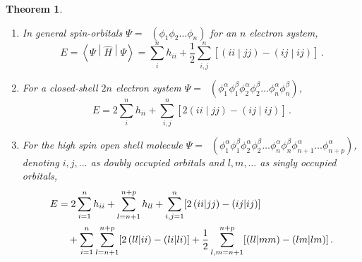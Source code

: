 \documentclass{article}
\theoremstyle{plain}\theoremheaderfont{\normalfont\itshape}\theorembodyfont{\rmfamily}\theoremseparator{.}\newtheorem*{rem}{Remark}\newtheorem*{ex}{Example}\newtheorem*{proof}{Proof}\newtheorem*{altp}{Alternative proof}
\theoremstyle{plain}\theoremheaderfont{\normalfont\bfseries}\theorembodyfont{\rmfamily}\theoremseparator{.}\newtheorem{thm}{Theorem}[section]\newtheorem{lem}[thm]{Lemma}\newtheorem{prop}[thm]{Proposition}\newtheorem*{cor}{Corollary}\newtheorem{defn}[thm]{Definition}\newtheorem{clm}[thm]{Claim}\newtheorem{clminproof}{Claim}
\theoremstyle{break}\theoremheaderfont{\normalfont\itshape}\theorembodyfont{\rmfamily}\theoremseparator{.\medskip}\newtheorem*{proofskip}{Proof}\newtheorem*{exs}{Examples}\newtheorem*{rems}{Remarks}
\theoremstyle{break}\theoremheaderfont{\normalfont\bfseries}\theorembodyfont{\rmfamily}\theoremseparator{.\medskip}\newtheorem{lemskip}[thm]{Lemma}\newtheorem{defnskip}[thm]{Definition}\newtheorem{propskip}[thm]{Proposition}\newtheorem{thmskip}[thm]{Theorem}
\numberwithin{equation}{section}
\newcommand{\expval}[2]{\left\langle #2 \middle| #1 \middle| #2 \right\rangle}
\newcommand{\bracket}[2]{\left( #1 \middle| #2 \right)}
\DeclareMathOperator{\antisymm}{\hat{\mathcal{A}}}
\begin{document}
    \begin{thmskip}
        \begin{enumerate}[topsep=0pt,label=(\roman*)]
            \item In general spin-orbitals \(\Psi=\antisymm(\phi_1\phi_2\dots\phi_n)\) for an \(n\) electron system,
            \begin{equation}
                E=\expval{\hat{H}}{\Psi}=\sum_{i}^{n}h_{ii}+\frac{1}{2}\sum_{i,j}^{n}[\bracket{ii}{jj}-\bracket{ij}{ij}]\,.
            \end{equation}
            \item For a closed-shell \(2n\) electron system \(\Psi=\antisymm(\phi_1^\alpha\phi_1^\beta\phi_2^\alpha\phi_2^\beta\dots\phi_n^\alpha\phi_n^\beta)\),
            \begin{equation}
                E=2\sum_{i}^{n}h_{ii}+\sum_{i,j}^{n}[2\bracket{ii}{jj}-\bracket{ij}{ij}]\,.
            \end{equation}
            \item For the high spin open shell molecule \(\Psi=\antisymm(\phi_1^\alpha\phi_1^\beta\phi_2^\alpha\phi_2^\beta\dots\phi_n^\alpha\phi_n^\beta\phi_{n+1}^\alpha\dots\phi_{n+p}^{\alpha})\), denoting \(i,j,\dots\) as doubly occupied orbitals and \(l,m,\dots\) as singly occupied orbitals,
            \begin{align}
                E&=2\sum_{i=1}^{n}h_{ii}+\sum_{l=n+1}^{n+p}h_{ll}+\sum_{i,j=1}^{n}[2\bracket{ii}{jj}-\bracket{ij}{ij}] \notag\\
                &\quad+\sum_{i=1}^{n}\sum_{l=n+1}^{n+p}[2\bracket{ll}{ii}-\bracket{li}{li}]+\frac{1}{2}\sum_{l,m=n+1}^{n+p}[\bracket{ll}{mm}-\bracket{lm}{lm}]\,.
            \end{align}
        \end{enumerate}
    \end{thmskip}
\end{document}
